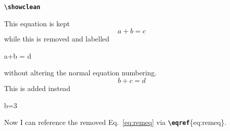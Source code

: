 \documentclass[10pt]{article}
\newcommand{\writecommand}[1]{\texttt{\textbf{{\textbackslash#1}}}}
\newcommand{\writearg}[1]{\{#1\}}
\begin{document}
\begin{center}
\begin{minipage}[t]{0.3\linewidth}
    \end{minipage}
    \hfill
    \begin{minipage}[t]{0.3\linewidth}   
    \writecommand{showclean}
    \showclean
    
    This equation is kept
    \begin{equation}
        a+b = c
    \end{equation}
    while this is removed and labelled
    \begin{remequation}
        a+b = d
    \end{remequation}\addtocounter{removedeqcounter}{-1}without altering the normal equation numbering.
    \begin{equation}
        b+c = d
    \end{equation}
    This is added instead
    \begin{addequation}
        b=3
    \end{addequation}\addtocounter{equation}{-3}

\end{minipage}
\end{center}
\showchanges

Now I can reference the removed Eq.~\eqref{eq:remeq} via \writecommand{eqref}\writearg{eq:remeq}.
\end{document}
